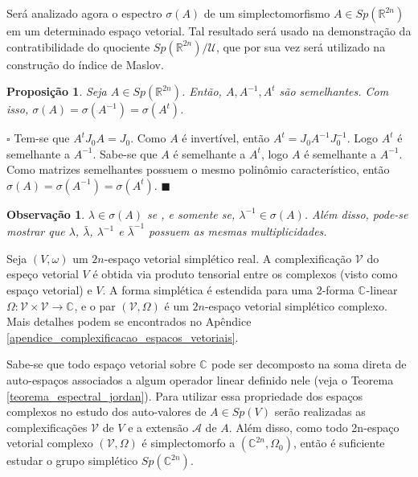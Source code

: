 \documentclass[12pt]{book}
\newtheorem{observacao}[teorema]{Observação}
\newtheorem{proposicao}[teorema]{Proposição}
\newenvironment{prova}[1]{$\square$ #1}{\hfill$\blacksquare$}
\newcommand{\complexificado}[1]{\mathcal{#1}}
\newcommand{\complexo}[1]{\mathbb{C}^{#1}}
\newcommand{\espectrooperador}[1]{\sigma(#1)}
\newcommand{\estruturacomplexa}{J_{0}}
\newcommand{\gruposimpletico}[1]{Sp(#1)}
\newcommand{\matrizSimpleticaOrtogonal}{\mathcal{U}}
\newcommand{\real}[1]{\mathbb{R}^{#1}}
\begin{document}
	Será analizado agora o espectro $\espectrooperador{A}$ de um simplectomorfismo $A \in \gruposimpletico{\real{2n}}$ em um determinado espaço vetorial. Tal resultado será usado na demonstração da contratibilidade do quociente $\gruposimpletico{\real{2n}}/\matrizSimpleticaOrtogonal$, que por sua vez será utilizado na construção do índice de Maslov.
	
	\begin{proposicao}\label{proposicao_caracterizacao_espectro_semelhante}
		Seja $A \in \gruposimpletico{\real{2n}}$. Então, $A, A^{-1}, A^{t}$ são semelhantes. Com isso, $\sigma(A) = \sigma(A^{-1}) = \sigma(A^{t}) $.
	\end{proposicao}
	\begin{prova}
		Tem-se que $A^{t}\estruturacomplexa A = \estruturacomplexa$. Como $A$ é invertível, então $A^{t} = \estruturacomplexa A^{-1} \estruturacomplexa^{-1}$. Logo $A^{t}$ é semelhante a $A^{-1}$. Sabe-se que $A$ é semelhante a $A^{t}$, logo $A$ é semelhante a $A^{-1}$. Como matrizes semelhantes possuem o mesmo polinômio característico, então $\sigma(A) = \sigma(A^{-1}) = \sigma(A^{t}) $.
	\end{prova}
	
	\begin{observacao}
		$\lambda \in \sigma(A)$ se , e somente se, $\lambda^{-1}\in \sigma(A)$. Além disso, pode-se mostrar que $\lambda$,  $\bar{\lambda}$, $\lambda^{-1}$ e $\bar{\lambda}^{-1}$ possuem as mesmas multiplicidades. 
	\end{observacao}
	
	Seja $(V,\omega)$ um $2n$-espaço vetorial simplético real. A complexificação $\complexificado{V}$ do espeço vetorial $V$ é obtida via produto tensorial entre os complexos (visto como espaço vetorial) e $V$. A forma simplética é estendida para uma 2-forma $\complexo{}$-linear $\Omega:\complexificado{V}\times \complexificado{V} \to \complexo{}$, e o par $(\complexificado{V}, \Omega)$ é um $2n$-espaço vetorial simplético complexo. Mais detalhes podem se encontrados no Apêndice \ref{apendice_complexificacao_espacos_vetoriais}.
	
	Sabe-se que todo espaço vetorial sobre $\complexo{}$ pode ser decomposto na soma direta de auto-espaços associados a algum operador linear definido nele (veja o Teorema \ref{teorema_espectral_jordan}). Para utilizar essa propriedade dos espaços complexos no estudo dos auto-valores de $A\in \gruposimpletico{V}$ serão realizadas as complexificações $\complexificado{V}$ de $V$ e a extensão  $\complexificado{A}$ de $A$. Além disso, como todo 2n-espaço vetorial complexo $(\complexificado{V}, \Omega)$ é simplectomorfo a $(\complexo{2n}, \Omega_{0})$, então é suficiente estudar o grupo simplético $\gruposimpletico{\complexo{2n}}$.
	
\end{document}
